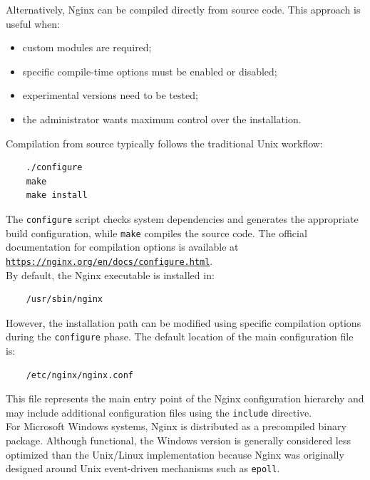 \documentclass{scrbook}
\begin{document}
	Alternatively, Nginx can be compiled directly from source code. This approach is useful when:
	\begin{itemize}
		\item custom modules are required;
		\item specific compile-time options must be enabled or disabled;
		\item experimental versions need to be tested;
		\item the administrator wants maximum control over the installation.
	\end{itemize}
	
	\newpage
	Compilation from source typically follows the traditional Unix workflow:
	
	\begin{verbatim}
	./configure
	make
	make install
	\end{verbatim}
	
	The \texttt{configure} script checks system dependencies and generates the appropriate build configuration, while \texttt{make} compiles the source code. The official documentation for compilation options is available at \href{https://nginx.org/en/docs/configure.html}{\texttt{https://nginx.org/en/docs/configure.html}}.\\
	
	By default, the Nginx executable is installed in:
	
	\begin{verbatim}
	/usr/sbin/nginx
	\end{verbatim}
	
	However, the installation path can be modified using specific compilation options during the \texttt{configure} phase. The default location of the main configuration file is:
	
	\begin{verbatim}
	/etc/nginx/nginx.conf
	\end{verbatim}
	
	This file represents the main entry point of the Nginx configuration hierarchy and may include additional configuration files using the \texttt{include} directive.\\
	
	For Microsoft Windows systems, Nginx is distributed as a precompiled binary package. Although functional, the Windows version is generally considered less optimized than the Unix/Linux implementation because Nginx was originally designed around Unix event-driven mechanisms such as \texttt{epoll}.
	
\end{document}
